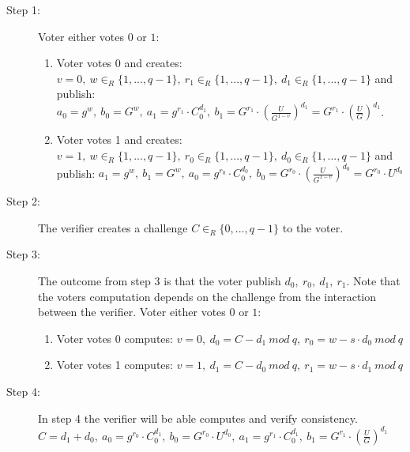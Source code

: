 \begin{description}
    \item[Step 1:] Voter either votes $0$ or $1$:
                    \begin{enumerate}
                        \item  Voter votes 0 and creates: \begin{math}v=0,\ w\in_R \{1,...,q-1\},\ r_1\in_R\{1,...,q-1\},\ d_1\in_R\{1,...,q-1\}\end{math} and 
                                publish: \begin{math}a_0 = g^w,\ b_0 = G^w,\ a_1 = g^{r_1} \cdot C^{d_1}_0,\ b_1 = G^{r_1}  \cdot  (\frac{U}{G^{1-v}})^{d_1} = G^{r_1}  \cdot  (\frac{U}{G})^{d_1} \end{math}.
                        \item  Voter votes 1 and creates: \begin{math}v=1,\ w\in_R \{1,...,q-1\},\ r_0\in_R\{1,...,q-1\},\ d_0\in_R\{1,...,q-1\}\end{math} and publish: \begin{math}a_1 = g^w,\ b_1 = G^w,\ a_0 = g^{r_0} \cdot C^{d_0}_0,\ b_0 = G^{r_0}  \cdot  (\frac{U}{G^{1-v}})^{d_0}=  G^{r_0}  \cdot  U^{d_0} \end{math}
                    \end{enumerate}

    

    
    \item[Step 2:] The verifier creates a challenge \begin{math}C\in_R \{0,...,q-1\}\end{math} to the voter.
    

    
    
    \item[Step 3:] The outcome from step 3 is that the voter publish \begin{math}d_0,\ r_0,\ d_1,\ r_1\end{math}. Note that the voters computation depends on the challenge from the interaction between the verifier. Voter either votes $0$ or $1$:
        \begin{enumerate}
            \item  Voter votes 0 computes: \begin{math}v=0,\ d_0= C-d_1\ mod\ q, \ r_0=w-s \cdot d_0 \ mod\ q\end{math}
            \item  Voter votes 1 computes: \begin{math}v=1,\ d_1= C-d_0\ mod\ q, \ r_1=w-s \cdot d_1 \ mod\ q\end{math}
        \end{enumerate}
    
        
    \item[Step 4:] In step 4 the verifier will be able computes and verify consistency.
    \begin{math}C = d_1 + d_0,\ a_0=g^{r_0}  \cdot  C^{d_1}_0,\ b_0 = G^{r_0} \cdot U^{d_0},\ a_1=g^{r_1}  \cdot  C^{d_1}_0,\ b_1= G^{r_1}  \cdot (\frac{U}{G})^{d_1}\end{math}
\end{description}

